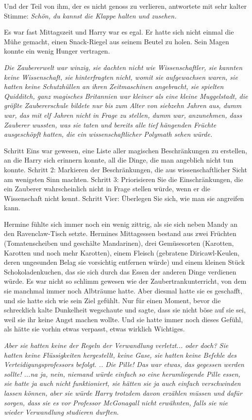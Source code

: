 Und der Teil von ihm, der es nicht genoss zu verlieren, antwortete mit sehr
kalter Stimme: \emph{Schön, du kannst die Klappe halten und zusehen.}

Es war fast Mittagszeit und Harry war es egal. Er hatte sich nicht einmal die
Mühe gemacht, einen Snack-Riegel aus seinem Beutel zu holen. Sein Magen konnte
ein wenig Hunger vertragen.

\emph{Die Zaubererwelt war winzig, sie dachten nicht wie Wissenschaftler, sie
kannten keine Wissenschaft, sie hinterfragten nicht, womit sie aufgewachsen
waren, sie hatten keine Schutzhüllen an ihren Zeitmaschinen angebracht, sie
spielten Quidditch, ganz magisches Britannien war kleiner als eine kleine
Muggelstadt, die größte Zaubererschule bildete nur bis zum Alter von siebzehn
Jahren aus, dumm war, das mit elf Jahren nicht in Frage zu stellen, dumm war,
anzunehmen, dass Zauberer wussten, was sie taten und bereits alle tief
hängenden Früchte ausgeschöpft hatten, die ein wissenschaftlicher Polymath
sehen würde.}

Schritt Eins war gewesen, eine Liste aller magischen Beschränkungen zu
erstellen, an die Harry sich erinnern konnte, all die Dinge, die man angeblich
nicht tun konnte. Schritt 2: Markieren der Beschränkungen, die aus
wissenschaftlicher Sicht am wenigsten Sinn machten. Schritt 3: Priorisieren Sie
die Einschränkungen, die ein Zauberer wahrscheinlich nicht in Frage stellen
würde, wenn er die Wissenschaft nicht kennt. Schritt Vier: Überlegen Sie sich,
wie man sie angreifen kann.

Hermine fühlte sich immer noch ein wenig zittrig, als sie sich neben Mandy an
den Ravenclaw-Tisch setzte. Hermines Mittagessen bestand aus zwei Früchten
(Tomatenscheiben und geschälte Mandarinen), drei Gemüsesorten (Karotten,
Karotten und noch mehr Karotten), einem Fleisch (gebratene Diricawl-Keulen,
deren ungesunden Belag sie vorsichtig entfernen würde) und einem kleinen Stück
Schokoladenkuchen, das sie sich durch das Essen der anderen Dinge verdienen
würde. Es war nicht so schlimm gewesen wie der Zaubertrankunterricht, von dem
sie manchmal immer noch Albträume hatte. Aber diesmal hatte sie es geschafft,
und sie hatte sich wie sein Ziel gefühlt. Nur für einen Moment, bevor die
schrecklich kalte Dunkelheit wegschaute und sagte, dass sie nicht böse auf sie
sei, weil sie ihr keine Angst machen wollte. Und sie hatte immer noch dieses
Gefühl, als hätte sie vorhin etwas verpasst, etwas wirklich Wichtiges.

\emph{ Aber sie hatten keine der Regeln der Verwandlung verletzt... oder doch?
Sie hatten keine Flüssigkeiten hergestellt, keine Gase, sie hatten keine Befehle
des Verteidigungsprofessors befolgt. .. Die Pille! Das war etwas, das gegessen
werden sollte! ...na ja, nein, niemand würde einfach so eine herumliegende Pille
essen, sie hatte ja auch nicht funktioniert, sie hätten sie ja auch einfach
verschwinden lassen können, aber sie würde Harry trotzdem davon erzählen müssen
und dafür sorgen, dass sie es vor Professor McGonagall nicht erwähnten, falls
sie nie wieder Verwandlung studieren durften.}

